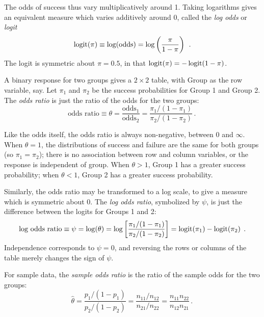 The odds of success thus vary multiplicatively around 1.  Taking logarithms
gives an equivalent measure which varies additively around 0, called the
\emph{log odds} or \emph{logit}
\begin{equation*}
 \logit (\pi) \equiv \log (\mbox{odds}) = \log \left( \frac{\pi}{1-\pi} \right)
 \period
\end{equation*}
The logit is symmetric about $\pi = 0.5$, in that
$\logit (\pi) = - \logit (1-\pi)$.

A binary response for two groups gives a $2 \times 2$ table, with
Group as the row variable, say.  Let $\pi_1$ and $\pi_2$ be the
success probabilities for Group 1 and Group 2.  The \emph{odds ratio}
is just the ratio of the odds for the two groups:
\begin{equation*}%
 \mbox{odds ratio} \equiv \theta =
 \frac{\mbox{odds}_1} {\mbox{odds}_2} =
 \frac{\pi_1 / (1-\pi_1)} {\pi_2 / (1-\pi_2)}
 \period
\end{equation*}

Like the odds itself, the odds ratio is always non-negative, between
0 and $\infty$.  When $\theta = 1$, the distributions of success and
failure are the same for both groups (so $\pi_1 = \pi_2$);  there is
no association between row and column variables, or the response
is independent of group.
When $\theta > 1$, Group 1 has a greater success probability;
when $\theta < 1$, Group 2 has a greater success probability.

Similarly, the odds ratio may be transformed to a log scale, to give
a measure which is symmetric about 0.
The \emph{log odds ratio}, symbolized by $\psi$, is just the difference
between the logits for Groups 1 and 2:
\begin{equation*}%
 \mbox{log odds ratio} \equiv \psi
 = \log (\theta)
 = \log \left[ \frac{\pi_1 / (1-\pi_1)} {\pi_2 / (1-\pi_2)} \right]
 = \logit (\pi_1) - \logit(\pi_2)
 \period
\end{equation*}
Independence corresponds to $\psi =0$, and reversing the rows or columns
of the table merely changes the sign of $\psi$.

For sample data, the \emph{sample odds ratio} is the ratio of the sample
odds for the two groups:
\begin{equation}\label{eq:soddsratio}
 \hat{\theta} =  \frac{p_1 / (1-p_1)} {p_2 / (1-p_2)} =
 \frac{ n_{11} / n_{12} }{ n_{21} / n_{22}} =
 \frac{ n_{11} n_{22} } {n_{12} n_{21}}
 \period
\end{equation}

